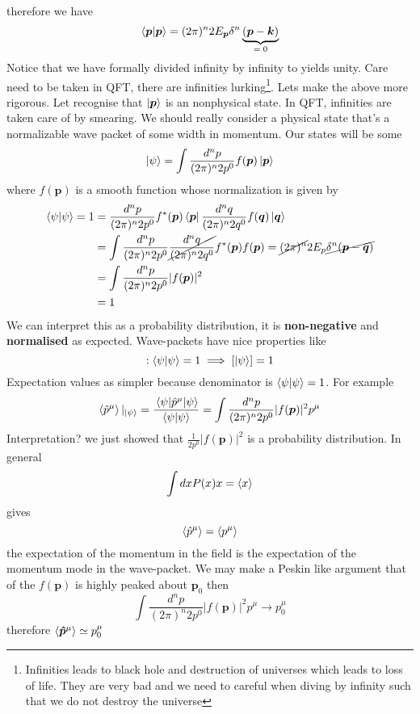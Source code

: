 therefore we have 
\begin{equation}
    \expval{\bm{p}|\bm{p}}=(2\pi)^n 2E_{\bm{p}}\delta^n \underbrace{(\bm{p} - \bm{k})}_\text{$ = 0$}
\end{equation}
Notice that we have formally divided infinity by infinity to yields unity. Care need to be taken in QFT, there are infinities lurking\footnote{Infinities leads to black hole and destruction of universes which leads to loss of life. They are very bad and we need to careful when diving by infinity such that we do not destroy the universe }. Lets make the above more rigorous. Let recognise that $\ket{\bm{p}}$ is an nonphysical state. In QFT, infinities are taken care of by smearing. We should really consider a physical state that's a normalizable wave packet of some width in momentum. Our states will be some 
\begin{equation}
    \ket{\psi} = \int \frac{d^n p}{(2\pi)^{n} 2p^0} f(\bm{p})\ket{\bm{p}}
\end{equation}
where $f(\bm{p})$ is a smooth function whose normalization is given by
\begin{align}
    \expval{\psi|\psi}  = 1 & = \frac{d^n p}{(2\pi)^{n} 2p^0} f^*(\bm{p})\bra{\bm{p}} \frac{d^n q}{(2\pi)^{n} 2q^0} f(\bm{q})\ket{\bm{q}} \nonumber\\
    & = \int \frac{d^n p}{(2\pi)^{n} 2p^0} \cancel{ \frac{d^n q}{(2\pi)^{n} 2q^0}} f^*(\bm{p})f(\bm{p}) = \cancel{(2\pi)^n} 2E_p \cancel{\delta^n (\bm{p} - \bm{q})} \nonumber\\
    & = \int \frac{d^n p}{(2\pi)^{n} 2p^0} |f(\bm{p})|^2 \nonumber\\
    & = 1
\end{align}
We can interpret this as a probability distribution, it is \textbf{non-negative} and \textbf{normalised} as expected. Wave-packets have nice properties like 
\begin{equation}
    [\ket{\psi}] : \expval{\psi|\psi} = 1 \implies [\ket{\psi}]  =1
\end{equation}
Expectation values as simpler because denominator is $\expval{\psi|\psi} = 1$. For example $$\expval{\hat{p}^\mu}|_{\ket{\psi}} = \frac{\mel{\psi}{\hat{p}^\mu}{\psi}}{\expval{\psi|\psi}} = \int \frac{d^n p}{(2\pi)^{n} 2p^0} |f(\bm{p})|^2 p^\mu$$
Interpretation? we just showed that $\frac{1}{2p^0}|f(\bm{p})|^2$ is a probability distribution. In general $$\int dx P(x) x = \expval{x}$$ gives $$\expval{\hat{p}^\mu} = \expval{p^\mu}$$
the expectation of the momentum in the field is the expectation of the momentum mode in the wave-packet. We may make a Peskin\cite{peskin2018introduction} like argument that of the $f(\bm{p})$ is highly peaked about $\bm{p}_0$ then 
\begin{equation}
    \int \frac{d^n p}{(2\pi)^{n} 2p^0} |f(\bm{p})|^2 p^\mu \to p_{0}^{\mu}
\end{equation}
therefore $\expval{\bm{\hat{p}}^\mu} \simeq p_{0}^{\mu}$

